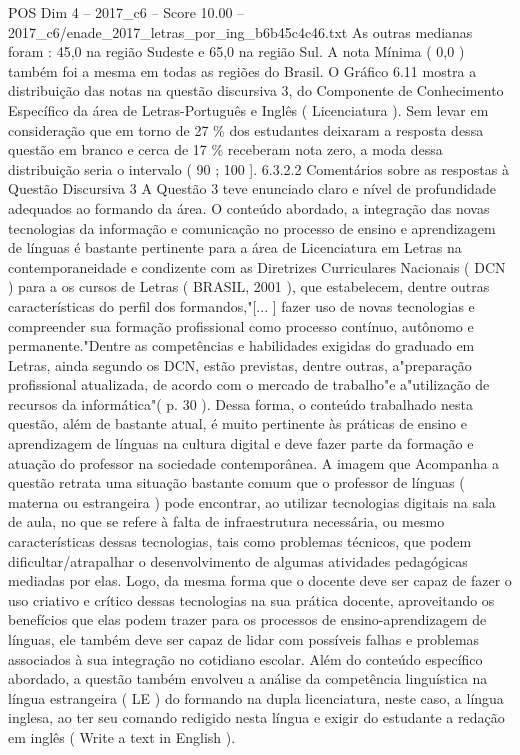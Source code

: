 \begin{textsample}{POS Dim 4 – 2017\_c6 – Score 10.00 – 2017\_c6/enade\_2017\_letras\_por\_ing\_b6b45c4c46.txt}
As outras medianas foram : 45,0 na região Sudeste e 65,0 na região Sul.
A nota Mínima ( 0,0 ) também foi a mesma em todas as regiões do Brasil.
O Gráfico 6.11 mostra a distribuição das notas na questão discursiva 3, do Componente de Conhecimento Específico da área de Letras-Português e Inglês ( Licenciatura ).
Sem levar em consideração que em torno de 27 \% dos estudantes deixaram a resposta dessa questão em branco e cerca de 17 \% receberam nota zero, a moda dessa distribuição seria o intervalo ( 90 ; 100 ]. 6.3.2.2 Comentários sobre as respostas à Questão Discursiva 3 A Questão 3 teve enunciado claro e nível de profundidade adequados ao formando da área.
O conteúdo abordado, a integração das novas tecnologias da informação e comunicação no processo de ensino e aprendizagem de línguas é bastante pertinente para a área de Licenciatura em Letras na contemporaneidade e condizente com as Diretrizes Curriculares Nacionais ( DCN ) para a os cursos de Letras ( BRASIL, 2001 ), que estabelecem, dentre outras características do perfil dos formandos,"[... ] fazer uso de novas tecnologias e compreender sua formação profissional como processo contínuo, autônomo e permanente."Dentre as competências e habilidades exigidas do graduado em Letras, ainda segundo os DCN, estão previstas, dentre outras, a"preparação profissional atualizada, de acordo com o mercado de trabalho"e a"utilização de recursos da informática"( p. 30 ).
Dessa forma, o conteúdo trabalhado nesta questão, além de bastante atual, é muito pertinente às práticas de ensino e aprendizagem de línguas na cultura digital e deve fazer parte da formação e atuação do professor na sociedade contemporânea.
A imagem que Acompanha a questão retrata uma situação bastante comum que o professor de línguas ( materna ou estrangeira ) pode encontrar, ao utilizar tecnologias digitais na sala de aula, no que se refere à falta de infraestrutura necessária, ou mesmo características dessas tecnologias, tais como problemas técnicos, que podem dificultar/atrapalhar o desenvolvimento de algumas atividades pedagógicas mediadas por elas.
Logo, da mesma forma que o docente deve ser capaz de fazer o uso criativo e crítico dessas tecnologias na sua prática docente, aproveitando os benefícios que elas podem trazer para os processos de ensino-aprendizagem de línguas, ele também deve ser capaz de lidar com possíveis falhas e problemas associados à sua integração no cotidiano escolar.
Além do conteúdo específico abordado, a questão também envolveu a análise da competência linguística na língua estrangeira ( LE ) do formando na dupla licenciatura, neste caso, a língua inglesa, ao ter seu comando redigido nesta língua e exigir do estudante a redação em inglês ( Write a text in English ).

\end{textsample}
